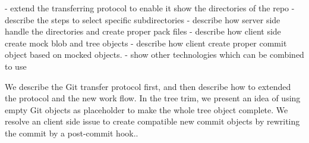 \documentclass[preprint]{sigplanconf}
\begin{document}
  - extend the transferring protocol to enable it show the directories of the repo
  - describe the steps to select specific subdirectories
  - describe how server side handle the directories and create proper pack files
  - describe how client side create mock blob and tree objects 
  - describe how client create proper commit object based on mocked objects.
- show other technologies which can be combined to use 

We describe the Git transfer protocol first, and then describe how to extended the protocol and the new work flow.
In the tree trim, we present an idea of using empty Git objects as placeholder to make the whole tree object complete.
We resolve an client side issue to create compatible new commit objects by rewriting the commit by a post-commit hook..

\begin{thebibliography}{10}
    \softraggedright


\end{thebibliography}
\end{document}
